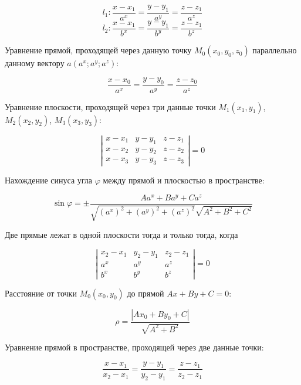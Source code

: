 \documentclass{article}
\newcommand{\parspace}{\vspace{20pt}}
\theoremstyle{break}
\begin{document}
\section{}

\[ l_1: \frac{x - x_1}{a^x} = \frac{y - y_1}{a^y} = \frac{z - z_1}{a^z} \]
\[ l_2: \frac{x - x_1}{b^x} = \frac{y - y_1}{b^y} = \frac{z - z_1}{b^z} \]

\parspace

Уравнение прямой, проходящей через данную точку $M_0(x_0, y_0, z_0)$ параллельно
данному вектору $a(a^x; a^y; a^z)$:

\[\frac{x - x_0}{a^x} = \frac{y - y_0}{a^y} = \frac{z - z_0}{a^z} \]

\parspace

Уравнение плоскости, проходящей через три данные точки
$M_1(x_1, y_1)$, $M_2(x_2, y_2)$, $M_3(x_3, y_3)$:

\[ \left| \begin{matrix}
  x - x_1 & y - y_1 & z - z_1 \\
  x - x_2 & y - y_2 & z - z_2 \\
  x - x_3 & y - y_3 & z - z_3 
\end{matrix} \right| = 0 \]

\parspace

Нахождение синуса угла $\varphi$ между прямой и плоскостью в пространстве:

\[ \sin \varphi = \pm
\frac{A a^x + B a^y + C a^z}
{\sqrt{(a^x)^2 + (a^y)^2 + (a^z)^2} \sqrt{A^2 + B^2 + C^2}} \]

\parspace

Две прямые лежат в одной плоскости тогда и только тогда, когда

\[ \left| \begin{matrix}
  x_2 - x_1 & y_2 - y_1 & z_2 - z_1 \\
  a^x & a^y & a^z \\
  b^x & b^y & b^z
\end{matrix} \right| = 0 \]

\parspace

Расстояние от точки $M_0(x_0, y_0)$ до прямой $Ax + By + C = 0$:

\[ \rho = \frac{| Ax_0 + By_0 + C |}{\sqrt{A^2 + B^2}} \]

\parspace

Уравнение прямой в пространстве, проходящей через две данные точки:

\[ \frac{x - x_1}{x_2 - x_1} = \frac{y - y_1}{y_2 - y_1} = \frac{z - z_1}{z_2 - z_1} \]
\end{document}
